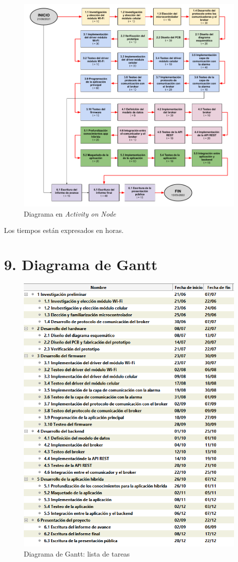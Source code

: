 \documentclass[
11pt, %
]{charter}
\begin{document}
\begin{figure}[htpb]
\centering 
\includegraphics[width=\textwidth]{./Figuras/AoN.png}
\caption{Diagrama en \textit{Activity on Node}}
\label{fig:AoN}
\end{figure}

Los tiempos están expresados en horas.



\section{9. Diagrama de Gantt}
\label{sec:gantt}


\begin{figure}[htpb]
\centering 
\includegraphics[width=.75\textwidth]{./Figuras/gantt1.png}
\caption{Diagrama de Gantt: lista de tareas}
\label{fig:gantt1}
\end{figure}
\end{document}
